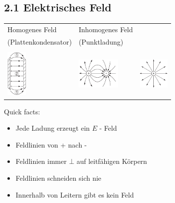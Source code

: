 \subsection{2.1 Elektrisches Feld}
    \begin{tabular}{l|l l}
        Homogenes Feld & Inhomogenes Feld & 
        \\(Plattenkondensator) & (Punktladung) & 
        \\
        \\\includegraphics[width = 10mm]{src/images/kondensator.png} & \includegraphics[width = 21mm]{src/images/zwei_punktladung.png} & \includegraphics[width = 15mm]{src/images/punktladung.png}
    \end{tabular}
    \vspace{2mm}

    Quick facts:
    \begin{itemize}
        \item Jede Ladung erzeugt ein $E$ - Feld \vspace{-1mm}
        \item Feldlinien von + nach - \vspace{-1mm}
        \item Feldlinien immer $\bot$ auf leitfähigen Körpern \vspace{-1mm}
        \item Feldlinien schneiden sich nie \vspace{-1mm}
        \item Innerhalb von Leitern gibt es kein Feld
    \end{itemize}

